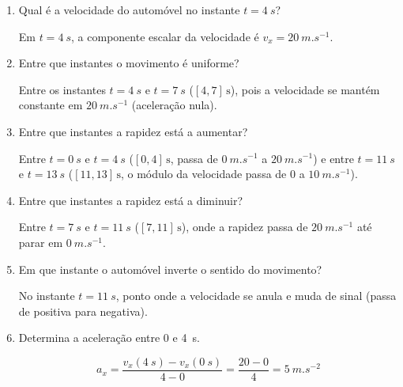 \documentclass[11pt,a4paper]{article}
\begin{document}
	\begin{enumerate}[label=\textbf{\arabic*.},resume]
		
		\item Qual é a velocidade do automóvel no instante $t=\SI{4}{s}$?
		
		\begin{solucao}
			Em $t = \SI{4}{s}$, a componente escalar da velocidade é $v_x = \SI{20}{m.s^{-1}}$.
		\end{solucao}
		
		\item Entre que instantes o movimento é uniforme?
		
		\begin{solucao}
			Entre os instantes $t = \SI{4}{s}$ e $t = \SI{7}{s}$ ($[4, 7]\,\text{s}$), pois a velocidade se mantém constante em $\SI{20}{m.s^{-1}}$ (aceleração nula).
		\end{solucao}
		
		\item Entre que instantes a rapidez está a aumentar?
		
		\begin{solucao}
			Entre $t = \SI{0}{s}$ e $t = \SI{4}{s}$ ($[0, 4]\,\text{s}$, passa de $\SI{0}{m.s^{-1}}$ a $\SI{20}{m.s^{-1}}$) e entre $t = \SI{11}{s}$ e $t = \SI{13}{s}$ ($[11, 13]\,\text{s}$, o módulo da velocidade passa de $0$ a $\SI{10}{m.s^{-1}}$).
		\end{solucao}
		
		\item Entre que instantes a rapidez está a diminuir?
		
		\begin{solucao}
			Entre $t = \SI{7}{s}$ e $t = \SI{11}{s}$ ($[7, 11]\,\text{s}$), onde a rapidez passa de $\SI{20}{m.s^{-1}}$ até parar em $\SI{0}{m.s^{-1}}$.
		\end{solucao}
		
		\item Em que instante o automóvel inverte o sentido do movimento?
		
		\begin{solucao}
			No instante $t = \SI{11}{s}$, ponto onde a velocidade se anula e muda de sinal (passa de positiva para negativa).
		\end{solucao}
		
		\item Determina a aceleração entre $0$ e \SI{4}{s}.
		
		\begin{solucao}
			\[
			a_x = \frac{v_x(\SI{4}{s}) - v_x(\SI{0}{s})}{4 - 0} = \frac{20 - 0}{4} = \SI{5}{m.s^{-2}}
			\]
		\end{solucao}
		

\end{enumerate}
\end{document}
